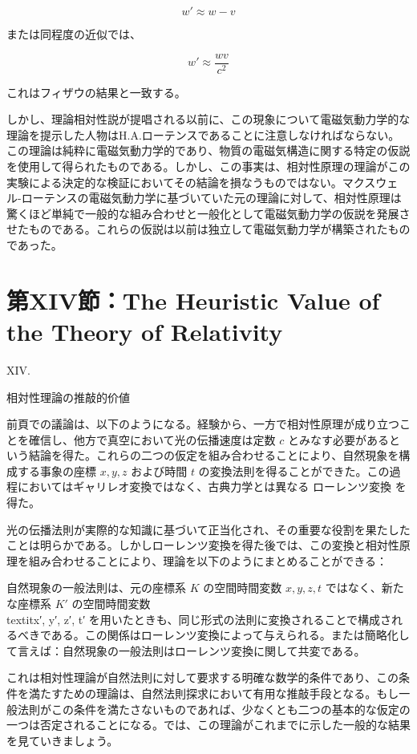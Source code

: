 \documentclass[a4paper,11pt,openany]{ltjsbook}
\begin{document}
\[
w' \approx w - v
\]

または同程度の近似では、

\[
w' \approx \frac{wv}{c^2}
\]

これはフィザウの結果と一致する。

しかし、理論相対性説が提唱される以前に、この現象について電磁気動力学的な理論を提示した人物はH.A.ローテンスであることに注意しなければならない。この理論は純粋に電磁気動力学的であり、物質の電磁気構造に関する特定の仮説を使用して得られたものである。しかし、この事実は、相対性原理の理論がこの実験による決定的な検証においてその結論を損なうものではない。マクスウェル-ローテンスの電磁気動力学に基づいていた元の理論に対して、相対性原理は驚くほど単純で一般的な組み合わせと一般化として電磁気動力学の仮説を発展させたものである。これらの仮説は以前は独立して電磁気動力学が構築されたものであった。


\clearpage
\chapter{第XIV節：The Heuristic Value of the Theory of Relativity}

XIV.

相対性理論の推敲的价値

前頁での議論は、以下のようになる。経験から、一方で相対性原理が成り立つことを確信し、他方で真空において光の伝播速度は定数 $c$ とみなす必要があるという結論を得た。これらの二つの仮定を組み合わせることにより、自然現象を構成する事象の座標 $x, y, z$ および時間 $t$ の変換法則を得ることができた。この過程においてはギャリレオ変換ではなく、古典力学とは異なる $ローレンツ変換$ を得た。

光の伝播法則が実際的な知識に基づいて正当化され、その重要な役割を果たしたことは明らかである。しかしローレンツ変換を得た後では、この変換と相対性原理を組み合わせることにより、理論を以下のようにまとめることができる：

自然現象の一般法則は、元の座標系 $K$ の空間時間変数 $x, y, z, t$ ではなく、新たな座標系 $K′$ の空間時間変数 \\textit{x′, y′, z′, t′} を用いたときも、同じ形式の法則に変換されることで構成されるべきである。この関係はローレンツ変換によって与えられる。または簡略化して言えば：自然現象の一般法則はローレンツ変換に関して共変である。

これは相対性理論が自然法則に対して要求する明確な数学的条件であり、この条件を満たすための理論は、自然法則探求において有用な推敲手段となる。もし一般法則がこの条件を満たさないものであれば、少なくとも二つの基本的な仮定の一つは否定されることになる。では、この理論がこれまでに示した一般的な結果を見ていきましょう。
\end{document}
